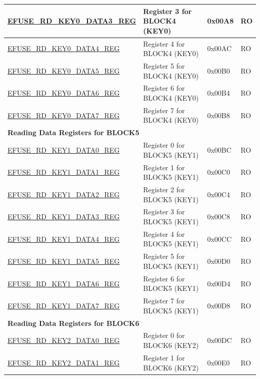 \begin{longtable}{ | p{7cm} | p{7.2cm} | p{1.3cm} | p{1cm} | }
\hyperref[regdesc:EFUSERDKEY0DATANREG]{EFUSE\_RD\_KEY0\_DATA3\_REG} & Register 3 for BLOCK4 (KEY0) & 0x00A8 & RO \\ \hline
\hyperref[regdesc:EFUSERDKEY0DATANREG]{EFUSE\_RD\_KEY0\_DATA4\_REG} & Register 4 for BLOCK4 (KEY0) & 0x00AC & RO \\ \hline
\hyperref[regdesc:EFUSERDKEY0DATANREG]{EFUSE\_RD\_KEY0\_DATA5\_REG} & Register 5 for BLOCK4 (KEY0) & 0x00B0 & RO \\ \hline
\hyperref[regdesc:EFUSERDKEY0DATANREG]{EFUSE\_RD\_KEY0\_DATA6\_REG} & Register 6 for BLOCK4 (KEY0) & 0x00B4 & RO \\ \hline
\hyperref[regdesc:EFUSERDKEY0DATANREG]{EFUSE\_RD\_KEY0\_DATA7\_REG} & Register 7 for BLOCK4 (KEY0) & 0x00B8 & RO \\ \hline
\multicolumn{4}{|l|}{\textbf{Reading Data Registers for BLOCK5}} \\ \hline
\hyperref[regdesc:EFUSERDKEY1DATAMREG]{EFUSE\_RD\_KEY1\_DATA0\_REG} & Register 0 for BLOCK5 (KEY1) & 0x00BC & RO \\ \hline
\hyperref[regdesc:EFUSERDKEY1DATAMREG]{EFUSE\_RD\_KEY1\_DATA1\_REG} & Register 1 for BLOCK5 (KEY1) & 0x00C0 & RO \\ \hline
\hyperref[regdesc:EFUSERDKEY1DATAMREG]{EFUSE\_RD\_KEY1\_DATA2\_REG} & Register 2 for BLOCK5 (KEY1) & 0x00C4 & RO \\ \hline
\hyperref[regdesc:EFUSERDKEY1DATAMREG]{EFUSE\_RD\_KEY1\_DATA3\_REG} & Register 3 for BLOCK5 (KEY1) & 0x00C8 & RO \\ \hline
\hyperref[regdesc:EFUSERDKEY1DATAMREG]{EFUSE\_RD\_KEY1\_DATA4\_REG} & Register 4 for BLOCK5 (KEY1) & 0x00CC & RO \\ \hline
\hyperref[regdesc:EFUSERDKEY1DATAMREG]{EFUSE\_RD\_KEY1\_DATA5\_REG} & Register 5 for BLOCK5 (KEY1) & 0x00D0 & RO \\ \hline
\hyperref[regdesc:EFUSERDKEY1DATAMREG]{EFUSE\_RD\_KEY1\_DATA6\_REG} & Register 6 for BLOCK5 (KEY1) & 0x00D4 & RO \\ \hline
\hyperref[regdesc:EFUSERDKEY1DATAMREG]{EFUSE\_RD\_KEY1\_DATA7\_REG} & Register 7 for BLOCK5 (KEY1) & 0x00D8 & RO \\ \hline
\multicolumn{4}{|l|}{\textbf{Reading Data Registers for BLOCK6}} \\ \hline
\hyperref[regdesc:EFUSERDKEY2DATANREG]{EFUSE\_RD\_KEY2\_DATA0\_REG} & Register 0 for BLOCK6 (KEY2) & 0x00DC & RO \\ \hline
\hyperref[regdesc:EFUSERDKEY2DATANREG]{EFUSE\_RD\_KEY2\_DATA1\_REG} & Register 1 for BLOCK6 (KEY2) & 0x00E0 & RO \\ \hline

\end{longtable}
